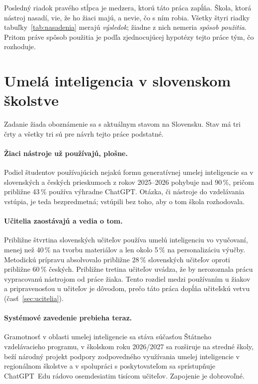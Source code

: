 Posledný riadok pravého stĺpca je medzera, ktorú táto práca zapĺňa. Škola, ktorá nástroj nasadí, vie, že ho žiaci majú, a nevie, čo s ním robia. Všetky štyri riadky tabuľky~\ref{tab:nasadenia} merajú \emph{výsledok}; žiadne z nich nemeria \emph{spôsob použitia}. Pritom práve spôsob použitia je podľa zjednocujúcej hypotézy tejto práce tým, čo rozhoduje.

\section{Umelá inteligencia v slovenskom školstve}
\label{sec:slovensko}

Zadanie žiada oboznámenie sa s aktuálnym stavom na Slovensku. Stav má tri črty a všetky tri sú pre návrh tejto práce podstatné.

\paragraph{Žiaci nástroje už používajú, plošne.} Podiel študentov používajúcich nejakú formu generatívnej umelej inteligencie sa v slovenských a českých prieskumoch z rokov 2025--2026 pohybuje nad 90\,\%, pričom približne 43\,\% používa výhradne ChatGPT. Otázka, či nástroje do vzdelávania vstúpia, je teda bezpredmetná; vstúpili bez toho, aby o tom škola rozhodovala.

\paragraph{Učitelia zaostávajú a vedia o tom.} Približne štvrtina slovenských učiteľov používa umelú inteligenciu vo vyučovaní, menej než 40\,\% na tvorbu materiálov a len okolo 5\,\% na personalizáciu výučby. Metodickú prípravu absolvovalo približne 28\,\% slovenských učiteľov oproti približne 60\,\% českých. Približne tretina učiteľov uvádza, že by nerozoznala prácu vypracovanú nástrojom od práce žiaka. Tento rozdiel medzi používaním u žiakov a pripravenosťou u učiteľov je dôvodom, prečo táto práca dopĺňa učiteľskú vetvu (časť~\ref{sec:ucitelia}).

\paragraph{Systémové zavedenie prebieha teraz.} Gramotnosť v oblasti umelej inteligencie sa stáva súčasťou Štátneho vzdelávacieho programu, v školskom roku 2026/2027 sa rozširuje na stredné školy, beží národný projekt podpory zodpovedného využívania umelej inteligencie v regionálnom školstve a v spolupráci s poskytovateľom sa sprístupňuje ChatGPT~Edu rádovo osemdesiatim tisícom učiteľov. Zapojenie je dobrovoľné.

